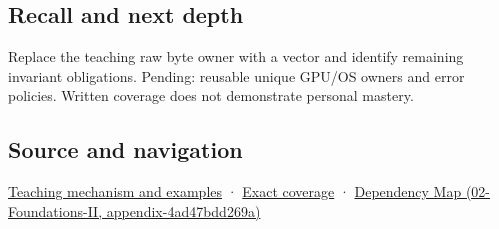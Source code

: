 \subsection{Recall and next depth}\label{appendix-7679107d057e-recall-and-next-depth}

Replace the teaching raw byte owner with a vector and identify remaining invariant obligations. Pending: reusable unique GPU/OS owners and error policies. Written coverage does not demonstrate personal mastery.

\subsection{Source and navigation}\label{appendix-7679107d057e-source-and-navigation}

\hyperref[01-foundations-i-ch003-from-three-repairs-to-five-decisions-to-zero-boilerplate]{Teaching mechanism and examples} · \hyperref[appendix-fd090d982a15-m009---parts-127-147]{Exact coverage} · \href{../02-Foundations-II/main.pdf\#nameddest=appendix-4ad47bdd269a}{Dependency Map (02-Foundations-II, appendix-4ad47bdd269a)}
